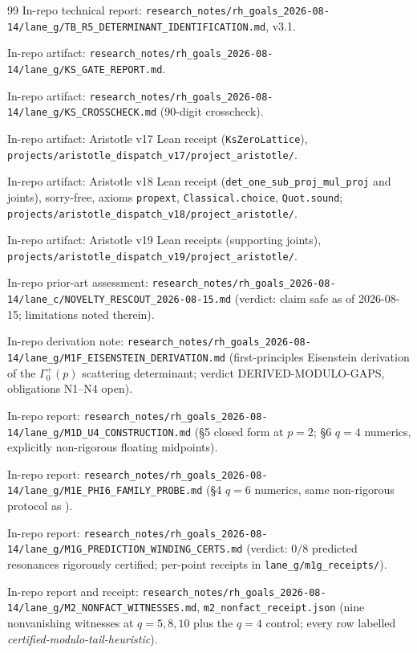 \documentclass[11pt]{article}
\theoremstyle{definition}
\theoremstyle{remark}
\begin{document}
\begin{thebibliography}{99}
In-repo technical report:
\texttt{research\_notes/rh\_goals\_2026-08-14/lane\_g/TB\_R5\_DETERMINANT\_IDENTIFICATION.md}, v3.1.

In-repo artifact:
\texttt{research\_notes/rh\_goals\_2026-08-14/lane\_g/KS\_GATE\_REPORT.md}.

In-repo artifact:
\texttt{research\_notes/rh\_goals\_2026-08-14/lane\_g/KS\_CROSSCHECK.md}
(90-digit crosscheck).

In-repo artifact: Aristotle v17 Lean receipt (\texttt{KsZeroLattice}),
\texttt{projects/aristotle\_dispatch\_v17/project\_aristotle/}.

In-repo artifact: Aristotle v18 Lean receipt
(\texttt{det\_one\_sub\_proj\_mul\_proj} and joints), sorry-free,
axioms \texttt{propext}, \texttt{Classical.choice},
\texttt{Quot.sound};
\texttt{projects/aristotle\_dispatch\_v18/project\_aristotle/}.

In-repo artifact: Aristotle v19 Lean receipts (supporting joints),
\texttt{projects/aristotle\_dispatch\_v19/project\_aristotle/}.

In-repo prior-art assessment:
\texttt{research\_notes/rh\_goals\_2026-08-14/lane\_c/NOVELTY\_RESCOUT\_2026-08-15.md}
(verdict: claim safe as of 2026-08-15; limitations noted therein).

In-repo derivation note:
\texttt{research\_notes/rh\_goals\_2026-08-14/lane\_g/M1F\_EISENSTEIN\_DERIVATION.md}
(first-principles Eisenstein derivation of the $\Gamma_0^+(p)$ scattering
determinant; verdict DERIVED-MODULO-GAPS, obligations N1--N4 open).

In-repo report:
\texttt{research\_notes/rh\_goals\_2026-08-14/lane\_g/M1D\_U4\_CONSTRUCTION.md}
(\S5 closed form at $p=2$; \S6 $q=4$ numerics, explicitly non-rigorous
floating midpoints).

In-repo report:
\texttt{research\_notes/rh\_goals\_2026-08-14/lane\_g/M1E\_PHI6\_FAMILY\_PROBE.md}
(\S4 $q=6$ numerics, same non-rigorous protocol as \cite{M1D}).

In-repo report:
\texttt{research\_notes/rh\_goals\_2026-08-14/lane\_g/M1G\_PREDICTION\_WINDING\_CERTS.md}
(verdict: $0/8$ predicted resonances rigorously certified; per-point
receipts in \texttt{lane\_g/m1g\_receipts/}).

In-repo report and receipt:
\texttt{research\_notes/rh\_goals\_2026-08-14/lane\_g/M2\_NONFACT\_WITNESSES.md},
\texttt{m2\_nonfact\_receipt.json} (nine nonvanishing witnesses at
$q = 5, 8, 10$ plus the $q=4$ control; every row labelled
\emph{certified-modulo-tail-heuristic}).


\end{thebibliography}
\end{document}
